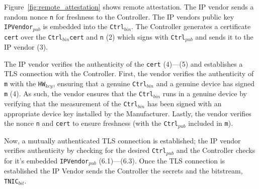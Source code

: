 Figure~\ref{fig:remote_attestation} shows \projecttitle{} remote attestation. The IP vendor sends a random nonce \texttt{n} for freshness to the Controller. The IP vendors public key \texttt{IPVendor$_{pub}$} is embedded into the \texttt{Ctrl$_{bin}$}. The Controller generates a certificate \texttt{cert} over the \texttt{Ctrl$_{bin}$cert} and \texttt{n} (2) which signs with \texttt{Ctrl$_{pub}$} and sends it to the IP vendor (3).


The IP vendor verifies the authenticity of the \texttt{cert} (4)---(5) and establishes a TLS connection with the Controller. First, the vendor verifies the authenticity of \texttt{m}  with the \texttt{HW$_{key}$}, ensuring that a genuine \texttt{Ctrl$_{bin}$} and a genuine device has signed \texttt{m} (4). As such, the vendor ensures that the \texttt{Ctrl$_{bin}$}  runs in a genuine \projecttitle{} device by verifying that the measurement of the \texttt{Ctrl$_{bin}$} has been signed with an appropriate device key installed by the Manufacturer. Lastly, the vendor verifies the nonce \texttt{n} and \texttt{cert} to ensure freshness (with the \texttt{Ctrl$_{pub}$} included in \texttt{m}). 

Now, a mutually authenticated TLS connection is established; the IP vendor verifies authenticity by checking for the desired \texttt{Ctrl$_{pub}$} and the Controller checks for it's embedded \texttt{IPVendor$_{pub}$} (6.1)---(6.3).
Once the TLS connection is established the IP Vendor sends the Controller the secrets and the \projecttitle{} bitstream, \texttt{TNIC$_{bit}$}.


